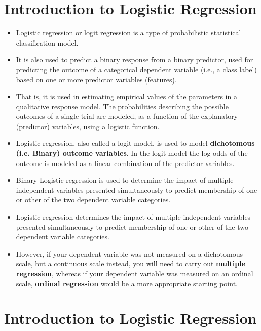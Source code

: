 \documentclass[a4paper,12pt]{article}
\begin{document}
\section{Introduction to Logistic Regression}
\begin{itemize}
	\item Logistic regression or logit regression is a type of probabilistic statistical classification model.
	
	\item It is also used to predict a binary response from a binary predictor, used for predicting the outcome of a categorical dependent variable (i.e., a class label) based on one or more predictor variables (features). 
	
	\item That is, it is used in estimating empirical values of the parameters in a qualitative response model. The probabilities describing the possible outcomes of a single trial are modeled, as a function of the explanatory (predictor) variables, using a logistic function. 
	
	\item Logistic regression, also called a logit model, is used to model \textbf{dichotomous (i.e. Binary) outcome variables}. In the logit model the log odds of the outcome is modeled as a linear combination of the predictor variables.
	
	\item 
	Binary Logistic regression is used to determine the impact of multiple independent variables
	presented simultaneously to predict membership of one or other of the two
	dependent variable categories.
	\item Logistic regression determines the impact of multiple independent variables
	presented simultaneously to predict membership of one or other of the two
	dependent variable categories.
	\item However, if your dependent variable was not measured on a dichotomous scale, but a continuous scale instead, you will need to carry out \textbf{multiple regression}, whereas if your dependent variable was measured on an ordinal scale, \textbf{ordinal regression} would be a more appropriate starting point.
\end{itemize}



\section*{Introduction to Logistic Regression}
\end{document}

